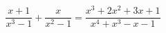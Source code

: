 \documentclass[12pt]{article}
\begin{document}
\sicpsize
\[
\frac{x + 1}{x^3 - 1} + \frac{x}{x^2 - 1} = \frac{x^3 + 2x^2 + 3x + 1}{x^4 + x^3 - x - 1}
\]
\end{document}
